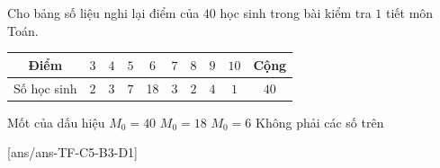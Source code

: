 \begin{ex}%
	Cho bảng số liệu nghi lại điểm của $ 40$ học sinh trong bài kiểm tra $ 1$ tiết môn Toán.
	\begin{center}
		\begin{tabular}{|c|c|c|c|c|c|c|c|c|c|}
			\hline
			Điểm & $ 3$ & $ 4$ & $ 5$ & $ 6$ & $ 7$ & $ 8$ & $ 9$ & $ 10$ & Cộng\\
			\hline
			Số học sinh & $ 2$ & $ 3$ & $ 7$ & 18 & $ 3$ & $ 2$ & $ 4$ & $ 1$ & $ 40$\\
			\hline
		\end{tabular}
	\end{center}
	Mốt của dấu hiệu
	\choice
	{$M_0=40$}
	{$M_0=18$}
	{\True $M_0=6$}
	{Không phải các số trên}
\end{ex}
\cauds
{}[ans/ans-TF-C5-B3-D1]
